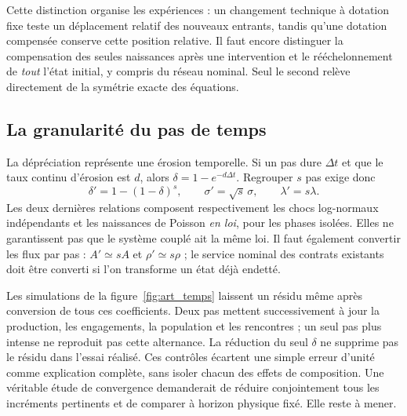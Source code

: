 Cette distinction organise les expériences : un changement technique
à dotation fixe teste un déplacement relatif des nouveaux entrants,
tandis qu'une dotation compensée conserve cette position relative.
Il faut encore distinguer la compensation des seules naissances après
une intervention et le rééchelonnement de \emph{tout} l'état initial,
y compris du réseau nominal. Seul le second relève directement de
la symétrie exacte des équations.

\subsection{La granularité du pas de temps}\label{sec:temps}
La dépréciation représente une érosion temporelle. Si un pas dure
$\Delta t$ et que le taux continu d'érosion est $d$, alors
$\delta=1-e^{-d\Delta t}$. Regrouper $s$ pas exige donc
\[
 \delta'=1-(1-\delta)^s,\qquad
 \sigma'=\sqrt{s}\,\sigma,\qquad \lambda'=s\lambda.
\]
Les deux dernières relations composent respectivement les chocs log-normaux
indépendants et les naissances de Poisson \emph{en loi}, pour les phases
isolées. Elles ne garantissent pas que le système couplé ait la même loi.
Il faut également convertir les flux par pas : $A'\simeq sA$ et
$\rho'\simeq s\rho$ ; le service nominal des contrats existants doit
être converti si l'on transforme un état déjà endetté.


Les simulations de la figure~\ref{fig:art_temps} laissent un résidu même
après conversion de tous ces coefficients. Deux pas mettent successivement
à jour la production, les engagements, la population et les rencontres ;
un seul pas plus intense ne reproduit pas cette alternance. La réduction
du seul $\delta$ ne supprime pas le résidu dans l'essai réalisé.
Ces contrôles écartent une simple erreur d'unité comme explication complète,
sans isoler chacun des effets de composition. Une véritable étude de
convergence demanderait de réduire conjointement tous les incréments
pertinents et de comparer à horizon physique fixé. Elle reste à mener.

